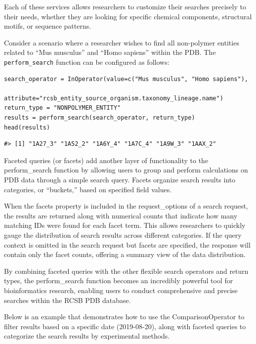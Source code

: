Each of these services allows researchers to customize their searches precisely to their needs, whether they are looking for specific chemical components, structural motifs, or sequence patterns.

Consider a scenario where a researcher wishes to find all non-polymer entities related to ``Mus musculus'' and ``Homo sapiens'' within the PDB. The \texttt{perform\_search} function can be configured as follows:

\begin{verbatim}
search_operator = InOperator(value=c("Mus musculus", "Homo sapiens"),
                             attribute="rcsb_entity_source_organism.taxonomy_lineage.name")
return_type = "NONPOLYMER_ENTITY"
results = perform_search(search_operator, return_type)
head(results)
\end{verbatim}

\begin{verbatim}
#> [1] "1A27_3" "1A52_2" "1A6Y_4" "1A7C_4" "1A9W_3" "1AAX_2"
\end{verbatim}

Faceted queries (or facets) add another layer of functionality to the perform\_search function by allowing users to group and perform calculations on PDB data through a simple search query. Facets organize search results into categories, or ``buckets,'' based on specified field values.

When the facets property is included in the request\_options of a search request, the results are returned along with numerical counts that indicate how many matching IDs were found for each facet term. This allows researchers to quickly gauge the distribution of search results across different categories. If the query context is omitted in the search request but facets are specified, the response will contain only the facet counts, offering a summary view of the data distribution.

By combining faceted queries with the other flexible search operators and return types, the perform\_search function becomes an incredibly powerful tool for bioinformatics research, enabling users to conduct comprehensive and precise searches within the RCSB PDB database.

Below is an example that demonstrates how to use the ComparisonOperator to filter results based on a specific date (2019-08-20), along with faceted queries to categorize the search results by experimental methods.

